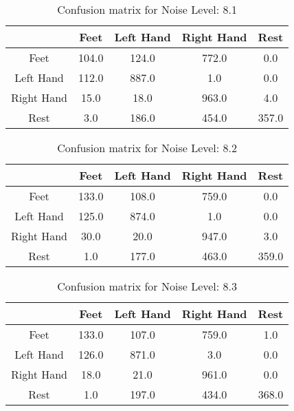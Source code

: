 \begin{table}[!htbp]
    \centering
    \begin{tabular}{|c||c|c|c|c|}
        \hline
		 & Feet & Left Hand & Right Hand & Rest \\
        \hline
        \hline
        Feet & 104.0 & 124.0 & 772.0 & 0.0 \\
        \hline
        Left Hand & 112.0 & 887.0 & 1.0 & 0.0 \\
        \hline
        Right Hand & 15.0 & 18.0 & 963.0 & 4.0 \\
        \hline
        Rest & 3.0 & 186.0 & 454.0 & 357.0 \\
        \hline
    \end{tabular}
    \caption{Confusion matrix for Noise Level: 8.1}
\end{table}

\begin{table}[!htbp]
    \centering
    \begin{tabular}{|c||c|c|c|c|}
        \hline
		 & Feet & Left Hand & Right Hand & Rest \\
        \hline
        \hline
        Feet & 133.0 & 108.0 & 759.0 & 0.0 \\
        \hline
        Left Hand & 125.0 & 874.0 & 1.0 & 0.0 \\
        \hline
        Right Hand & 30.0 & 20.0 & 947.0 & 3.0 \\
        \hline
        Rest & 1.0 & 177.0 & 463.0 & 359.0 \\
        \hline
    \end{tabular}
    \caption{Confusion matrix for Noise Level: 8.2}
\end{table}

\begin{table}[!htbp]
    \centering
    \begin{tabular}{|c||c|c|c|c|}
        \hline
		 & Feet & Left Hand & Right Hand & Rest \\
        \hline
        \hline
        Feet & 133.0 & 107.0 & 759.0 & 1.0 \\
        \hline
        Left Hand & 126.0 & 871.0 & 3.0 & 0.0 \\
        \hline
        Right Hand & 18.0 & 21.0 & 961.0 & 0.0 \\
        \hline
        Rest & 1.0 & 197.0 & 434.0 & 368.0 \\
        \hline
    \end{tabular}
    \caption{Confusion matrix for Noise Level: 8.3}
\end{table}

